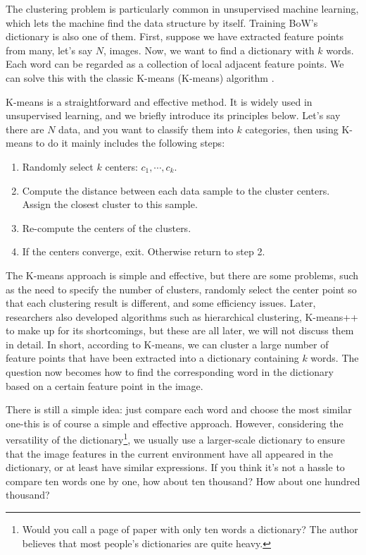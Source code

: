 The clustering problem is particularly common in unsupervised machine learning, which lets the machine find the data structure by itself. Training BoW's dictionary is also one of them. First, suppose we have extracted feature points from many, let's say $N$, images. Now, we want to find a dictionary with $k$ words. Each word can be regarded as a collection of local adjacent feature points. We can solve this with the classic K-means (K-means) algorithm {\cite{Lloyd1982}}.

K-means is a straightforward and effective method. It is widely used in unsupervised learning, and we briefly introduce its principles below. Let's say there are $N$ data, and you want to classify them into $k$ categories, then using K-means to do it mainly includes the following steps:

\begin{mdframed}
	\begin{enumerate}
		\item Randomly select $k$ centers: $c_1, \cdots, c_k$.
		\item Compute the distance between each data sample to the cluster centers. Assign the closest cluster to this sample. 
		\item Re-compute the centers of the clusters. 
		\item If the centers converge, exit. Otherwise return to step 2. 
	\end{enumerate}
\end{mdframed}

The K-means approach is simple and effective, but there are some problems, such as the need to specify the number of clusters, randomly select the center point so that each clustering result is different, and some efficiency issues. Later, researchers also developed algorithms such as hierarchical clustering, K-means++{\cite{Arthur2007}} to make up for its shortcomings, but these are all later, we will not discuss them in detail. In short, according to K-means, we can cluster a large number of feature points that have been extracted into a dictionary containing $k$ words. The question now becomes how to find the corresponding word in the dictionary based on a certain feature point in the image.

There is still a simple idea: just compare each word and choose the most similar one-this is of course a simple and effective approach. However, considering the versatility of the dictionary\footnote{Would you call a page of paper with only ten words a dictionary? The author believes that most people's dictionaries are quite heavy. }, we usually use a larger-scale dictionary to ensure that the image features in the current environment have all appeared in the dictionary, or at least have similar expressions. If you think it’s not a hassle to compare ten words one by one, how about ten thousand? How about one hundred thousand?

